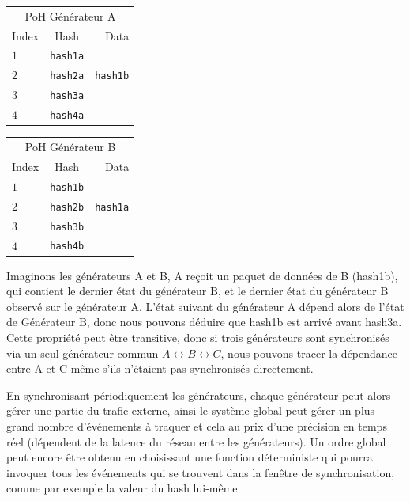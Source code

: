 \documentclass[12pt]{article}
\begin{document}
\begin{center}
  \begin{tabular}{|l c r|}

  \hline
    \multicolumn{3}{|c|}{PoH Générateur  A} \\
    Index & Hash & Data \\ \hline
    $1$ & \texttt{hash1a} & \\
    $2$ & \texttt{hash2a} & \texttt{hash1b} \\
    $3$ & \texttt{hash3a} & \\
    $4$ & \texttt{hash4a} & \\
    \hline
    \end{tabular}
  \begin{tabular}{| l  c  r |}
  \hline
    \multicolumn{3}{|c|}{PoH Générateur B} \\
    Index & Hash & Data \\ \hline
    $1$ & \texttt{hash1b} & \\
    $2$ & \texttt{hash2b} & \texttt{hash1a} \\
    $3$ & \texttt{hash3b} & \\
    $4$ & \texttt{hash4b} & \\
    \hline
    \end{tabular}
\end{center}

Imaginons les générateurs A et B, A reçoit un paquet de données de B (hash1b), qui contient le dernier état du générateur B, et le dernier état du générateur B observé sur le générateur A. L'état suivant du générateur A dépend alors de l'état de Générateur B, donc nous pouvons déduire que hash1b est arrivé avant hash3a. Cette propriété peut être transitive, donc si trois générateurs sont synchronisés via un seul générateur commun \(A \leftrightarrow B \leftrightarrow C \), nous pouvons tracer la dépendance entre A et C même s'ils n'étaient pas synchronisés directement.

En synchronisant périodiquement les générateurs, chaque générateur peut alors gérer une partie du trafic externe, ainsi le système global peut gérer un plus grand nombre d'événements à traquer et cela au prix d'une précision en temps réel (dépendent de la latence du réseau entre les générateurs). Un ordre global peut encore être obtenu en choisissant une fonction déterministe qui pourra invoquer tous les événements qui se trouvent dans la fenêtre de synchronisation, comme par exemple la valeur du hash lui-même.
\end{document}

